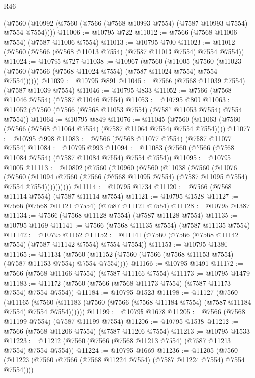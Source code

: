 \begin{lexlean}{R46}
\begin{coremodule}
    (@7560 (@10992 (@7560 (@7566 (@7568 @10993 @7554) (@7587 @10993 @7554) @7554 @7554))))
@11006 := @10795 @722
@11012 := @7566 (@7568 @11006 @7554) (@7587 @11006 @7554)
@11013 := @10795 @700
@11023 := @11012 (@7560 (@7566 (@7568 @11013 @7554) (@7587 @11013 @7554) @7554 @7554))
@11024 := @10795 @727
@11038 := @10967
    (@7560
      (@11005
        (@7560 (@11023 (@7560 (@7566 (@7568 @11024 @7554) (@7587 @11024 @7554) @7554 @7554))))))
@11039 := @10795 @891
@11045 := @7566 (@7568 @11039 @7554) (@7587 @11039 @7554)
@11046 := @10795 @833
@11052 := @7566 (@7568 @11046 @7554) (@7587 @11046 @7554)
@11053 := @10795 @800
@11063 := @11052 (@7560 (@7566 (@7568 @11053 @7554) (@7587 @11053 @7554) @7554 @7554))
@11064 := @10795 @849
@11076 := @11045
    (@7560 (@11063 (@7560 (@7566 (@7568 @11064 @7554) (@7587 @11064 @7554) @7554 @7554))))
@11077 := @10795 @998
@11083 := @7566 (@7568 @11077 @7554) (@7587 @11077 @7554)
@11084 := @10795 @993
@11094 := @11083 (@7560 (@7566 (@7568 @11084 @7554) (@7587 @11084 @7554) @7554 @7554))
@11095 := @10795 @1005
@11113 := @10802
    (@7560
      (@10960
        (@7560
          (@11038
            (@7560
              (@11076
                (@7560
                  (@11094
                    (@7560 (@7566 (@7568 @11095 @7554) (@7587 @11095 @7554) @7554 @7554))))))))))
@11114 := @10795 @1734
@11120 := @7566 (@7568 @11114 @7554) (@7587 @11114 @7554)
@11121 := @10795 @1528
@11127 := @7566 (@7568 @11121 @7554) (@7587 @11121 @7554)
@11128 := @10795 @1387
@11134 := @7566 (@7568 @11128 @7554) (@7587 @11128 @7554)
@11135 := @10795 @1169
@11141 := @7566 (@7568 @11135 @7554) (@7587 @11135 @7554)
@11142 := @10795 @1162
@11152 := @11141 (@7560 (@7566 (@7568 @11142 @7554) (@7587 @11142 @7554) @7554 @7554))
@11153 := @10795 @1380
@11165 := @11134
    (@7560 (@11152 (@7560 (@7566 (@7568 @11153 @7554) (@7587 @11153 @7554) @7554 @7554))))
@11166 := @10795 @1491
@11172 := @7566 (@7568 @11166 @7554) (@7587 @11166 @7554)
@11173 := @10795 @1479
@11183 := @11172 (@7560 (@7566 (@7568 @11173 @7554) (@7587 @11173 @7554) @7554 @7554))
@11184 := @10795 @1523
@11198 := @11127
    (@7560
      (@11165
        (@7560 (@11183 (@7560 (@7566 (@7568 @11184 @7554) (@7587 @11184 @7554) @7554 @7554))))))
@11199 := @10795 @1678
@11205 := @7566 (@7568 @11199 @7554) (@7587 @11199 @7554)
@11206 := @10795 @1538
@11212 := @7566 (@7568 @11206 @7554) (@7587 @11206 @7554)
@11213 := @10795 @1533
@11223 := @11212 (@7560 (@7566 (@7568 @11213 @7554) (@7587 @11213 @7554) @7554 @7554))
@11224 := @10795 @1669
@11236 := @11205
    (@7560 (@11223 (@7560 (@7566 (@7568 @11224 @7554) (@7587 @11224 @7554) @7554 @7554))))

\end{coremodule}
\end{lexlean}
